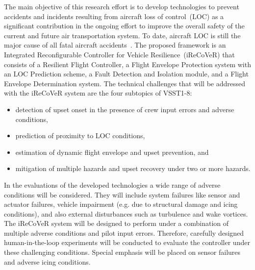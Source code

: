 \documentclass[letter,onecolumn,12pt]{aiaa-tc}
\begin{document}
The main objective of this research effort is to develop technologies to prevent accidents and incidents resulting from aircraft loss of control~(LOC) as a significant contribution in the ongoing effort to improve the overall safety of the current and future air transportation system. To date, aircraft LOC is still the major cause of all fatal aircraft accidents~\cite{LOC04_LOCMetrics,LOC_2007,MST08_upsets,LOC_2010,LOC10_Belcastro_analysis,LOC10_Belcastro_concept}. The proposed framework is an Integrated Reconfigurable Controller for Vehicle Resilience~\mbox{(iReCoVeR)} that consists of a Resilient Flight Controller, a Flight Envelope Protection system with an LOC Prediction scheme, a Fault Detection and Isolation module, and a Flight Envelope Determination system. The technical challenges that will be addressed with the iReCoVeR system are the four subtopics of VSST1-8:
\begin{itemize}
\setlength{\itemsep}{-3pt}
\vspace{-2mm}
    \item detection of upset onset in the presence of crew input errors and adverse conditions,
    \item prediction of proximity to LOC conditions,
    \item estimation of dynamic flight envelope and upset prevention, and
    \item mitigation of multiple hazards and upset recovery under two or more hazards.
\end{itemize}
In the evaluations of the developed technologies a wide range of adverse conditions will be considered. They will include system failures like sensor and actuator failures, vehicle impairment (e.g. due to structural damage and icing conditions), and also external disturbances such as turbulence and wake vortices. The iReCoVeR system will be designed to perform under a combination of multiple adverse conditions and pilot input errors. Therefore, carefully designed human-in-the-loop experiments will be conducted to evaluate the controller under these challenging conditions. Special emphasis will be placed on sensor failures and adverse icing conditions.
\end{document}
